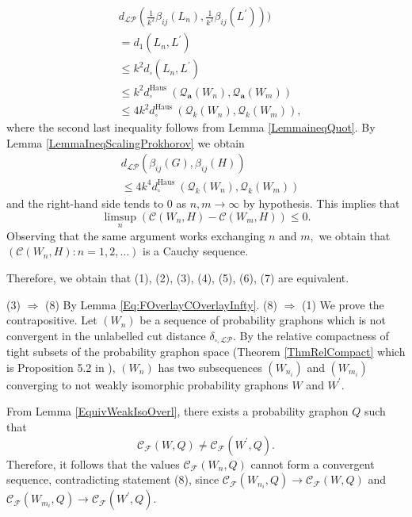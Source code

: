 \documentclass[11pt]{article}
\newcommand{\cF}{{\mathcal F}}  %
\begin{document}
$$\begin{aligned}
&d_{\mathcal{LP}}(\frac{1}{k^2}\beta_{ij}(L_n),\frac{1}{k^2}\beta_{ij}(L^{\prime})))\\
&= d_1\left(L_n, L^{\prime}\right)\\ &\leq k^2 d_{\square}\left(L_n, L^{\prime}\right) \\
& \leq k^2 d_{\square}^{\text {Haus }}\left(\mathcal{Q}_{\mathbf{a}}\left(W_n\right), \mathcal{Q}_{\mathbf{a}}\left(W_m\right)\right)\\
&\leq 4k^2 d_{\square}^{\text {Haus }}\left(\mathcal{Q}_k\left(W_n\right), \mathcal{Q}_k\left(W_m\right)\right),\end{aligned}
$$
where the second last inequality follows from Lemma \ref{LemmaineqQuot}.  
By Lemma \ref{LemmaIneqScalingProkhorov} we obtain $$\begin{aligned}
&d_{\mathcal{LP}}(\beta_{ij}(G),\beta_{ij}(H))\\
&\leq 4k^4 d_{\square}^{\text {Haus }}\left(\mathcal{Q}_k\left(W_n\right), \mathcal{Q}_k\left(W_m\right)\right)\end{aligned}
$$
and the right-hand side tends to 0 as $n, m \rightarrow \infty$ by hypothesis. This implies that
$$
\limsup _n\left(\mathcal{C}\left(W_n, H\right)-\mathcal{C}\left(W_m, H\right)\right) \leq 0 .
$$
Observing that the same argument works exchanging $n$ and $m,$ we obtain that $\left(\mathcal{C}\left(W_n, H\right): n=1,2, \ldots\right)$ is a Cauchy sequence.\newline

Therefore, we obtain that (1), (2), (3), (4), (5), (6), (7) are equivalent.

(3) $\Rightarrow$ (8) By Lemma \ref{Eq:FOverlayCOverlayInfty}. \newline
(8) $\Rightarrow$ (1) We prove the contrapositive. Let $\left(W_n\right)$ be a sequence of probability graphons which is not convergent in the unlabelled cut distance $\delta_{\square,\mathcal{LP}}$. By the relative compactness of tight subsets of the probability graphon space (Theorem \ref{ThmRelCompact} which is Proposition 5.2 in \cite{abraham2023probabilitygraphons}), $\left(W_n\right)$ has two subsequences $\left(W_{n_i}\right)$ and $\left(W_{m_i}\right)$ converging to not weakly isomorphic probability graphons $W$ and $W^{\prime}$. 

From Lemma \ref{EquivWeakIsoOverl}, there exists a probability graphon $Q$ such that
$$
\mathcal{C}_{\cF}\left(W, Q\right)\neq \mathcal{C}_{\cF}\left(W^{\prime}, Q\right).$$
Therefore, it follows that the values $\mathcal{C}_{\cF}\left(W_n, Q\right)$ cannot form a convergent sequence, contradicting statement (8), since $\mathcal{C}_{\cF}\left(W_{n_i}, Q\right) \rightarrow \mathcal{C}_{\cF}(W, Q)$ and $\mathcal{C}_{\cF}\left(W_{m_i}, Q\right) \rightarrow \mathcal{C}_{\cF}\left(W^{\prime}, Q\right).$ \newline
\endproof
\end{document}
